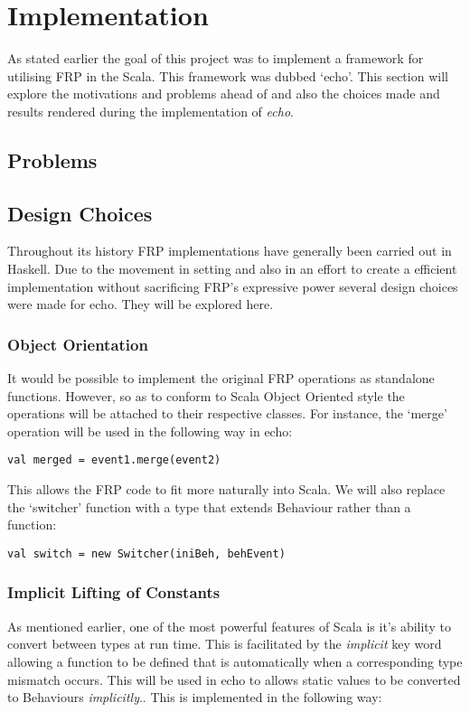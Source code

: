 \chapter{Implementation}
  As stated earlier the goal of this project was to implement a framework for utilising FRP in the Scala. 
  This framework was dubbed `echo'. This section will explore the motivations and problems ahead of
  and also the choices made and results rendered during the implementation of \emph{echo}.
    
  \section{Problems}
  
  \section{Design Choices}
  Throughout its history FRP implementations have generally been carried out in Haskell. Due to the movement
  in setting and also in an effort to create a efficient implementation without sacrificing FRP's expressive power
  several design choices were made for echo. They will be explored here.
      
    \subsection{Object Orientation}
      It would be possible to implement the original FRP operations as standalone functions. However, so
      as to conform to Scala Object Oriented style the operations will be attached to their respective
      classes. For instance, the `merge' operation will be used in the following way in echo:
      
\begin{verbatim}
val merged = event1.merge(event2)
\end{verbatim}

    This allows the FRP code to fit more naturally into Scala. We will also replace the `switcher' function
    with a type that extends Behaviour rather than a function:
    
\begin{verbatim}
val switch = new Switcher(iniBeh, behEvent)
\end{verbatim}

    \subsection{Implicit Lifting of Constants}
      As mentioned earlier, one of the most powerful features of Scala is it's ability to convert between
      types at run time. This is facilitated by the \emph{implicit} key word allowing a function to be defined
      that is automatically when a corresponding type mismatch occurs. This will be used in echo to allows 
      static values to be converted to Behaviours \emph{implicitly}.. This is implemented in the following way:  

